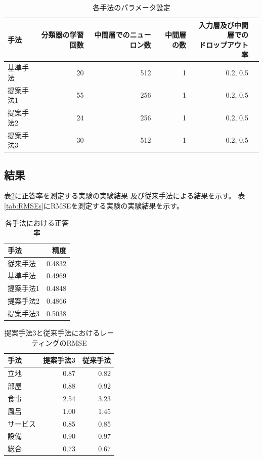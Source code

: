 \documentclass[twocolumn,a4paper]{ltjarticle}
\begin{document}
\begin{table}[t]
  \caption{各手法のパラメータ設定}
  \centering
  \begin{tabular}{l | r r r r r} \label{tab:ParametersOfBaselineMethod}
    手法 & 分類器の学習回数 & 中間層でのニューロン数 & 中間層の数
    & \makecell{入力層及び中間層での\\ドロップアウト率} \\
    \hline
    基準手法  & 20 & 512 & 1 & 0.2, 0.5 \\
    提案手法1 & 55 & 256 & 1 & 0.2, 0.5 \\
    提案手法2 & 24 & 256 & 1 & 0.2, 0.5 \\
    提案手法3 & 30 & 512 & 1 & 0.2, 0.5 \\
  \end{tabular}
\end{table}


\subsection{結果}

表\ref{tab:Accuracies}に正答率を測定する実験の実験結果
及び従来手法による結果を示す。
表\ref{tab:RMSEs}にRMSEを測定する実験の実験結果を示す。

\begin{table}
  \caption{各手法における正答率}
  \centering
  \begin{tabular}{l | r} \label{tab:Accuracies}
    手法 & 精度 \\
    \hline
    従来手法  & 0.4832 \\
    基準手法  & 0.4969 \\
    提案手法1 & 0.4848 \\
    提案手法2 & 0.4866 \\
    提案手法3 & 0.5038 \\
  \end{tabular}
\end{table}

\begin{table}
  \caption{提案手法3と従来手法におけるレーティングのRMSE}
  \centering
  \begin{tabular}{l | r r} \label{tab:RSMEs}
    手法 & 提案手法3 & 従来手法 \\
    \hline
    立地      & 0.87 & 0.82 \\
    部屋      & 0.88 & 0.92 \\
    食事      & 2.54 & 3.23 \\
    風呂      & 1.00 & 1.45 \\
    サービス  & 0.85 & 0.85 \\
    設備      & 0.90 & 0.97 \\
    総合      & 0.73 & 0.67 \\
  \end{tabular}
\end{table}
\end{document}
